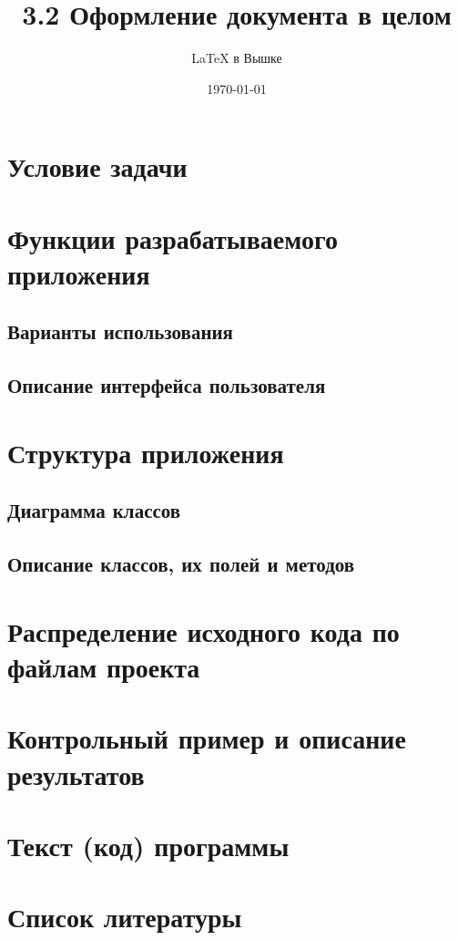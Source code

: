 \documentclass[a4paper,12pt, fleqn]{article}
\author{\LaTeX{} в Вышке}
\title{3.2 Оформление документа в целом}
\date{\today}
\theoremstyle{plain} %
\theoremstyle{definition} %
\theoremstyle{remark} %
\numberwithin{equation}{section}
\begin{document}
	

\tableofcontents

\section{Условие задачи}


\section{Функции разрабатываемого приложения}

\subsection{Варианты использования}

\subsection{Описание интерфейса пользователя}


\section{Структура приложения}

\subsection{Диаграмма классов}

\subsection{Описание классов, их полей и методов}


\section{Распределение исходного кода по файлам проекта}


\section{Контрольный пример и описание результатов}


\section{Текст (код) программы}


\section{Список литературы}
\end{document}
